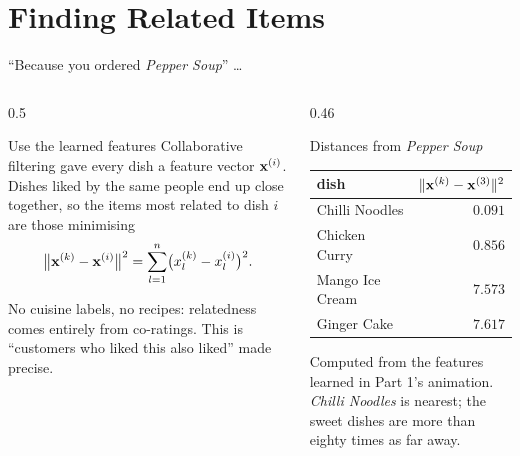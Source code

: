 \documentclass[aspectratio=169,10pt]{beamer}
\begin{document}
\section{Finding Related Items}

\begin{frame}{``Because you ordered \emph{Pepper Soup}'' \dots}
  \begin{columns}[T,onlytextwidth]
    \begin{column}{0.5\textwidth}
      \begin{block}{Use the learned features}
        \footnotesize
        Collaborative filtering gave every dish a feature vector $\mathbf{x}^{(i)}$. Dishes
        liked by the same people end up close together, so the items most related to
        dish $i$ are those minimising
        \[ \bigl\|\mathbf{x}^{(k)} - \mathbf{x}^{(i)}\bigr\|^2 = \sum_{l=1}^{n}\bigl(x^{(k)}_l - x^{(i)}_l\bigr)^2 . \]
      \end{block}
      \begin{keyidea}
        No cuisine labels, no recipes: relatedness comes entirely from co-ratings. This
        is ``customers who liked this also liked'' made precise.
      \end{keyidea}
    \end{column}
    \begin{column}{0.46\textwidth}
      \footnotesize
      \begin{block}{Distances from \emph{Pepper Soup}}
        \renewcommand{\arraystretch}{1.18}
        \begin{tabular}{@{}lr@{}}
          \toprule
          dish & $\|\mathbf{x}^{(k)} - \mathbf{x}^{(3)}\|^2$\\
          \midrule
        Chilli Noodles & $0.091$\\
        Chicken Curry & $0.856$\\
        Mango Ice Cream & $7.573$\\
        Ginger Cake & $7.617$\\
          \bottomrule
        \end{tabular}
      \end{block}
      Computed from the features learned in Part 1's animation. \emph{Chilli Noodles}
      is nearest; the sweet dishes are more than eighty times as far away.
    \end{column}
  \end{columns}
\end{frame}
\end{document}
